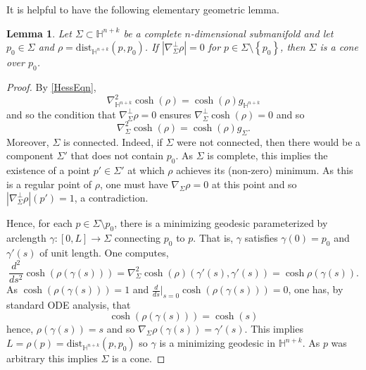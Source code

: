 \documentclass{amsart}
\newtheorem{lem}[thm]{Lemma}
\theoremstyle{definition}
\theoremstyle{remark}
\numberwithin{equation}{section}
\newcommand{\set}[1]{\left\{#1\right\}}
\newcommand{\dist}[0]{\mathrm{dist}}
\begin{document}
It is helpful to have the following elementary geometric lemma.
\begin{lem}\label{ConeLem}
Let $\Sigma \subset \mathbb{H}^{n+k}$ be a complete $n$-dimensional submanifold and let $p_0\in \Sigma$ and $\rho=\dist_{\mathbb{H}^{n+k}}(p,p_0)$. If $|\nabla_\Sigma^\perp \rho|=0$ for $p\in \Sigma\setminus \set{p_0}$, then $\Sigma$ is a cone over $p_0$.
\end{lem}
\begin{proof}
By \eqref{HessEqn},
	$$
	\nabla_{\mathbb{H}^{n+k}}^2 \cosh(\rho)=\cosh(\rho) g_{\mathbb{H}^{n+k}}
	$$
 and so the condition that $\nabla_\Sigma^\perp \rho=0$ ensures $\nabla_\Sigma^\perp \cosh (\rho)=0$ and so
	$$
	\nabla_{\Sigma}^2 \cosh(\rho)= \cosh(\rho) g_{\Sigma}.
	$$
	Moreover, $\Sigma$ is connected.  Indeed, if $\Sigma$ were not connected, then there would be a component $\Sigma'$ that does not contain $p_0$.  As $\Sigma$ is complete, this implies the existence of a point $p'\in \Sigma'$ at which $\rho$ achieves its (non-zero) minimum.  As this is a regular point of $\rho$, one must have $\nabla_{\Sigma}\rho=0$ at this point and so $|\nabla^\perp_\Sigma \rho|(p')=1$, a contradiction.

Hence, for each $p\in \Sigma\setminus p_0$, there is a minimizing geodesic parameterized by arclength $\gamma:[0,L]\to \Sigma$ connecting $p_0$ to $p$. That is, $\gamma$ satisfies $\gamma(0)=p_0$ and $\gamma'(s)$ of unit length. 
	One computes, 
	$$
	\frac{d^2}{ds^2} \cosh(\rho(\gamma(s)))=\nabla^2_{\Sigma} \cosh(\rho) (\gamma'(s), \gamma'(s))=\cosh\rho(\gamma(s)).
	$$
	As $\cosh(\rho(\gamma(s)))=1$ and $\frac{d}{ds}|_{s=0} \cosh(\rho(\gamma(s)))=0$, one has, by standard ODE analysis, that
	$$
	\cosh(\rho(\gamma(s)))=\cosh(s)
	$$
	hence, $\rho(\gamma(s))=s$ and so $\nabla_{\Sigma} \rho(\gamma(s))=\gamma'(s)$.  This implies $L=\rho(p)=\dist_{\mathbb{H}^{n+k}}(p,p_0)$ so $\gamma$ is a minimizing geodesic in $\mathbb{H}^{n+k}$.  As $p$ was arbitrary this implies $\Sigma$ is a cone.
\end{proof}
\end{document}
